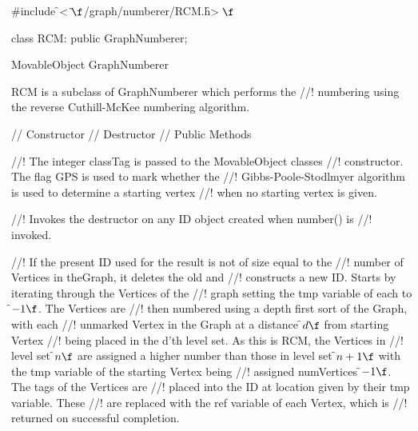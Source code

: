 

\indent \#include \f$<\tilde{ }\f$/graph/numberer/RCM.h\f$>\f$

\indent class RCM: public GraphNumberer;

\indent MovableObject
\indent\indent GraphNumberer
\indent\indent{}

\indent RCM is a subclass of GraphNumberer which performs the
//! numbering using the reverse Cuthill-McKee numbering algorithm.

\indent\indent // Constructor
\indent{}
\indent\indent // Destructor
\indent{}
\indent\indent // Public Methods
\indent{}
\indent{}
\indent{}
\indent{}

//! The integer \p classTag is passed to the MovableObject classes
//! constructor. The flag \p GPS is used to mark whether the
//! Gibbs-Poole-Stodlmyer algorithm is used to determine a starting vertex
//! when no starting vertex is given.

//! Invokes the destructor on any ID object created when number() is
//! invoked.

//! If the present ID used for the result is not of size equal to the
//! number of Vertices in \p theGraph, it deletes the old and
//! constructs a new ID. Starts by iterating through the Vertices of the
//! graph setting the \p tmp variable of each to \f$-1\f$. The Vertices are
//! then numbered using a depth first sort of the Graph, with each
//! unmarked Vertex in the Graph at a distance \f$d\f$ from starting Vertex
//! being placed in the d'th level set. As this is RCM, the Vertices in
//! level set \f$n\f$ are assigned a higher number than those in level set
\f$n+1\f$ with the \p tmp variable of the starting Vertex being
//! assigned \p numVertices \f$-1\f$. The \p tags of the Vertices are
//! placed into the ID at location given by their \p tmp variable. These
//! are replaced with the \p ref variable of each Vertex, which is
//! returned on successful completion. 


